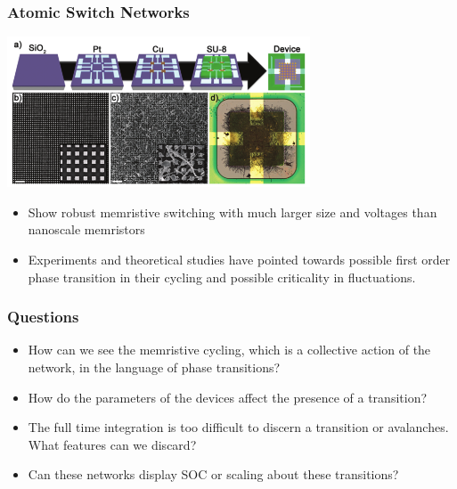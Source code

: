 \documentclass[mathserif]{beamer}
\begin{document}
\begin{frame}
\frametitle{Atomic Switch Networks}

\begin{center}
\includegraphics[width=9cm]{ASN_fabrication.png}
\end{center}
\begin{itemize}
\item Show robust memristive switching with much larger size and voltages than
nanoscale memristors
\item Experiments and theoretical studies have pointed towards possible first order phase
transition in their cycling and possible criticality in fluctuations.
\end{itemize}

\end{frame}

\begin{frame}
\frametitle{Questions}
\begin{itemize}
\item How can we see the memristive cycling, which is a collective action of the network,
in the language of phase transitions?
\item How do the parameters of the devices affect the presence of a transition?
\item The full time integration is too difficult to discern a transition or avalanches.
What features can we discard?
\item Can these networks display SOC or scaling about these transitions?
\end{itemize}
\end{frame}
\end{document}
